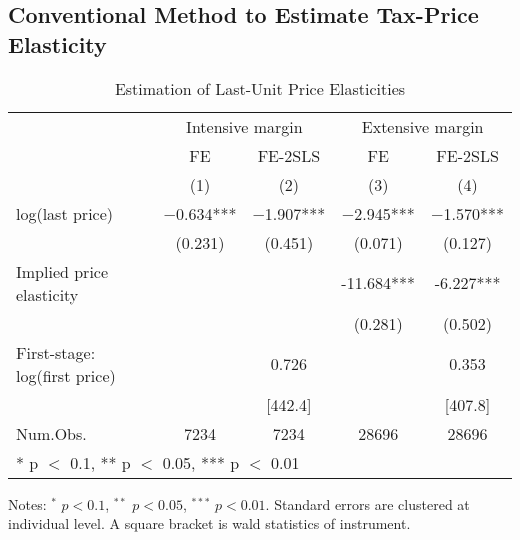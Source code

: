 \documentclass[
  11pt,
  a4paper,
]{article}
\begin{document}
\hypertarget{conventional-method-to-estimate-tax-price-elasticity}{%
\subsection{Conventional Method to Estimate Tax-Price Elasticity}\label{conventional-method-to-estimate-tax-price-elasticity}}

\begin{table}

\caption{\label{tab:MainElasticity}Estimation of Last-Unit Price Elasticities}
\centering
\fontsize{7}{9}\selectfont
\begin{threeparttable}
\begin{tabular}[t]{lcccc}
\toprule
\multicolumn{1}{c}{ } & \multicolumn{2}{c}{Intensive margin} & \multicolumn{2}{c}{Extensive margin} \\
\cmidrule(l{3pt}r{3pt}){2-3} \cmidrule(l{3pt}r{3pt}){4-5}
\multicolumn{1}{c}{ } & \multicolumn{1}{c}{FE} & \multicolumn{1}{c}{FE-2SLS} & \multicolumn{1}{c}{FE} & \multicolumn{1}{c}{FE-2SLS} \\
\cmidrule(l{3pt}r{3pt}){2-2} \cmidrule(l{3pt}r{3pt}){3-3} \cmidrule(l{3pt}r{3pt}){4-4} \cmidrule(l{3pt}r{3pt}){5-5}
  & (1) & (2) & (3) & (4)\\
\midrule
log(last price) & \num{-0.634}*** & \num{-1.907}*** & \num{-2.945}*** & \num{-1.570}***\\
 & (\num{0.231}) & (\num{0.451}) & (\num{0.071}) & (\num{0.127})\\
\midrule
Implied price elasticity &  &  & -11.684*** & -6.227***\\
 &  &  & (0.281) & (0.502)\\
First-stage: log(first price) &  & 0.726 &  & 0.353\\
 &  & {}[442.4] &  & {}[407.8]\\
Num.Obs. & \num{7234} & \num{7234} & \num{28696} & \num{28696}\\
\bottomrule
\multicolumn{5}{l}{\rule{0pt}{1em}* p $<$ 0.1, ** p $<$ 0.05, *** p $<$ 0.01}\\
\end{tabular}
\begin{tablenotes}
\item Notes: $^{*}$ $p < 0.1$, $^{**}$ $p < 0.05$, $^{***}$ $p < 0.01$. Standard errors are clustered at individual level. A square bracket is wald statistics of instrument.
\end{tablenotes}
\end{threeparttable}
\end{table}
\end{document}
